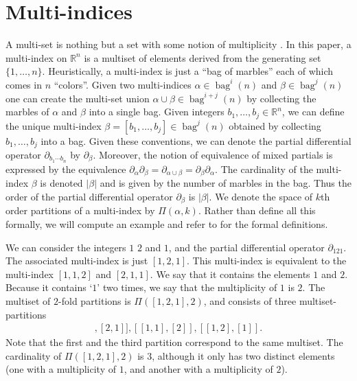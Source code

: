 \documentclass[12pt]{amsart}
\newcommand{\R}{\ensuremath{\mathbb{R}}}
\DeclareMathOperator{\bag}{bag}
\begin{document}
\section{Multi-indices}
\label{app:multi}
A multi-set is nothing but a set with some notion of multiplicity \cite{Blizard1989}.
In this paper, a multi-index on $\R^n$ is a multiset of elements derived from the generating set $\{1,\dots,n\}$.
Heuristically, a multi-index is just a ``bag of marbles'' each of which comes in $n$ ``colors''.
Given two multi-indices $\alpha \in \bag^i(n)$ and $\beta \in \bag^j(n)$ one can create the
multi-set union $\alpha \cup \beta \in \bag^{i+j}(n)$ by collecting the marbles of $\alpha$ and $\beta$ into a single bag.
Given integers $b_1,\dots,b_j \in \R^n$, we can define the unique multi-index $\beta = [b_1,\dots,b_j] \in \bag^j(n)$
obtained by collecting $b_1,\dots,b_j$ into a bag.
Given these conventions, we can denote the partial differential operator $\partial_{b_1 \cdots b_n }$ by $\partial_\beta$.
Moreover, the notion of equivalence of mixed partials is expressed by the equivalence 
$\partial_\alpha \partial_\beta = \partial_{\alpha \cup \beta} = \partial_\beta \partial_\alpha$.
The cardinality of the multi-index $\beta$ is denoted $|\beta|$ and is given by the number of marbles in the bag.
Thus the order of the partial differential operator $\partial_{\beta}$ is $|\beta|$.
We denote the space of $k$th order partitions of a multi-index by $\Pi(\alpha,k)$.
Rather than define all this formally, we will compute an example and refer to \cite{Jacobs2014b} for the formal definitions.

We can consider the integers $1$ $2$ and $1$, and the partial differential operator $\partial_{121}$.
The associated multi-index is just $[1,2,1]$.  This multi-index is equivalent to the multi-index $[1,1,2]$ and $[2,1,1]$.
We say that it contains the elements $1$ and $2$.
Because it contains `$1$' two times, we say that the multiplicity of $1$ is $2$.
The multiset of $2$-fold partitions is $\Pi( [1,2,1],2)$, and consists of three multiset-partitions
\begin{align*}
	[ [1] , [2,1] ] , [[1,1] , [2] ] , [ [1, 2] , [1] ].
\end{align*}
Note that the first and the third partition correspond to the same multiset.
The cardinality of $\Pi( [1,2,1],2)$ is $3$, although it only has two distinct elements (one with a multiplicity of $1$, and another with a multiplicity of $2$).
\end{document}
